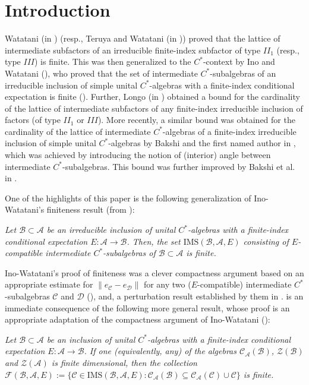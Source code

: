 \documentclass{amsart}
\numberwithin{equation}{section}
\newcommand{\IMS}{\mathrm{IMS}}
\newcommand{\mcal}{\mathcal}
\newcommand{\1}{\mathbf{1}}
\newcommand{\mA}{\mathcal{A}}
\newcommand{\mB}{\mathcal{B}}
\newcommand{\mC}{\mathcal{C}}
\newcommand{\mD}{\mathcal{D}}
\begin{document}
\section{Introduction}
 Watatani (in \cite{Wat2}) (resp., Teruya and Watatani (in \cite{TW}))
 proved that the lattice of intermediate subfactors of an irreducible
 finite-index subfactor of type $II_1$ (resp., type $III$) is
 finite. This was then generalized to the $C^*$-context by Ino and
 Watatani (\cite{IW}), who proved that the set of intermediate
 $C^*$-subalgebras of an irreducible inclusion of simple unital
 $C^*$-algebras with a finite-index conditional expectation is finite
 (\cite[Corollary 3.9]{IW}). Further, Longo (in \cite{Longo}) obtained a
 bound for the cardinality of the lattice of intermediate subfactors
 of any finite-index irreducible inclusion of factors (of type $II_1$
 or $III$). More recently, a similar bound was obtained for the
 cardinality of the lattice of intermediate $C^*$-algebras of a
 finite-index irreducible inclusion of simple unital $C^*$-algebras by
 Bakshi and the first named author in \cite{BG}, which was achieved by
 introducing the notion of (interior) angle between intermediate
 $C^*$-subalgebras. This bound was further improved by Bakshi et
 al. in \cite{BE}.\smallskip


One of the highlights of this paper is the following generalization of
Ino-Watatani's finiteness result (from \cite{IW}):\smallskip


 {\em Let $\mB \subset {\mA}$ be an
  irreducible inclusion of unital $C^*$-algebras with a finite-index
  conditional expectation $E: {\mA} \to \mB$. Then, the set $\IMS(\mB,
  {\mA}, E)$ consisting of $E$-compatible intermediate $C^*$-subalgebras
  of $\mB \subset \mA$ is finite.}
\smallskip


Ino-Watatani's proof of finiteness was a clever compactness argument
based on an appropriate estimate for $\|e_\mC - e_\mD\|$ for any two
($E$-compatible) intermediate $C^*$-subalgebras $\mC$ and $\mD$ (\cite[Lemma
  3.3]{IW}), and, a perturbation result established by them in
\cite[Theorem 3.8]{IW}.   is an  immediate consequence of the
following more general result, whose proof is an appropriate adaptation of
the compactness argument of Ino-Watatani (\cite{IW}):\smallskip

   {\it Let $\mB \subset {\mA} $ be an
    inclusion of unital $C^{*}$-algebras with a finite-index
    conditional expectation $E : \mA \rightarrow \mB$. If one
    (equivalently, any) of the algebras $\mcal{C}_{\mA}(\mB)$, $\mcal{Z}(\mB)$
    and $\mcal{Z}(\mA)$ is finite dimensional, then the collection
    \(
    \mathcal{F}(\mB , \mA, E):= \{\mC \in \IMS(\mB, \mA, E) : \mC_{\mA}(\mB)  \subseteq \mC_{\mA}(\mC) \cup \mC \}
    \)
    is  finite.
  }
\smallskip
\end{document}
